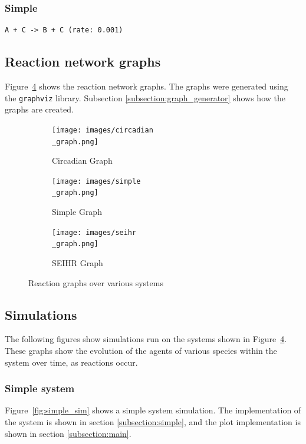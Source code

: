 \subsubsection{Simple}
\begin{verbatim}
A + C -> B + C (rate: 0.001)
\end{verbatim}

\subsection{Reaction network graphs}
Figure~\ref{fig:graphs} shows the reaction network graphs.
The graphs were generated using the \texttt{graphviz} library.
Subsection \ref{subsection:graph_generator} shows how the graphs are created.

\begin{figure}[H]
\centering
\begin{subfigure}{.3\textwidth}
  \centering
  \texttt{[image: images/circadian\\\_graph.png]}
  \caption{Circadian Graph}
  \label{fig:circadian}
\end{subfigure}%
\begin{subfigure}{.3\textwidth}
  \centering
  \texttt{[image: images/simple\\\_graph.png]}
  \caption{Simple Graph}
  \label{fig:simple}
\end{subfigure}
\begin{subfigure}{.3\textwidth}
  \centering
  \texttt{[image: images/seihr\\\_graph.png]}
  \caption{SEIHR Graph}
  \label{fig:seihr}
\end{subfigure}
\caption{Reaction graphs over various systems}
\label{fig:graphs}
\end{figure}

\subsection{Simulations}
The following figures show simulations run on the systems shown in Figure~\ref{fig:graphs}.
These graphs show the evolution of the agents of various species within the system over time, as reactions occur.

\subsubsection{Simple system}
Figure~\ref{fig:simple_sim} shows a simple system simulation.
The implementation of the system is shown in section \ref{subsection:simple}, and the plot implementation is shown in section \ref{subsection:main}.

